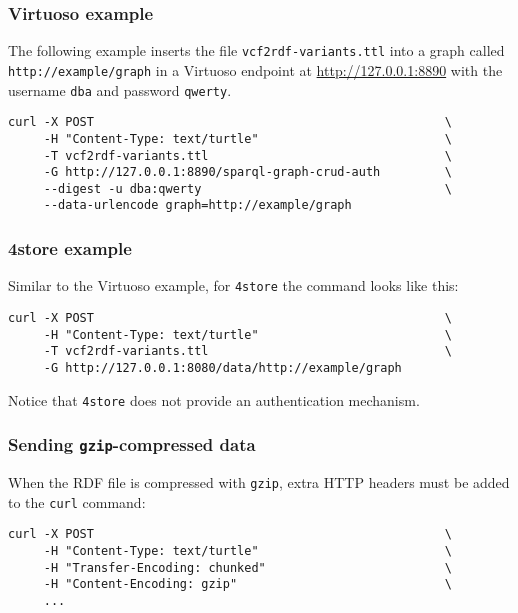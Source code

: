 \subsubsection{Virtuoso example}

\begin{sloppypar}
The following example inserts the file \texttt{vcf2rdf-variants.ttl} into
a graph called \texttt{http://example/graph} in a Virtuoso endpoint at
\url{http://127.0.0.1:8890} with the username \texttt{dba} and
password \texttt{qwerty}.
\end{sloppypar}

\begin{siderules}
\begin{verbatim}
curl -X POST                                                 \
     -H "Content-Type: text/turtle"                          \
     -T vcf2rdf-variants.ttl                                 \
     -G http://127.0.0.1:8890/sparql-graph-crud-auth         \
     --digest -u dba:qwerty                                  \
     --data-urlencode graph=http://example/graph
\end{verbatim}
\end{siderules}

\subsubsection{4store example}

Similar to the Virtuoso example, for \texttt{4store} the command looks like
this:

\begin{siderules}
\begin{verbatim}
curl -X POST                                                 \
     -H "Content-Type: text/turtle"                          \
     -T vcf2rdf-variants.ttl                                 \
     -G http://127.0.0.1:8080/data/http://example/graph
\end{verbatim}
\end{siderules}

Notice that \texttt{4store} does not provide an authentication mechanism.

\subsubsection{Sending \texttt{gzip}-compressed data}

  When the RDF file is compressed with \texttt{gzip}, extra HTTP headers must
  be added to the \texttt{curl} command:
\begin{siderules}
\begin{verbatim}
curl -X POST                                                 \
     -H "Content-Type: text/turtle"                          \
     -H "Transfer-Encoding: chunked"                         \
     -H "Content-Encoding: gzip"                             \
     ...
\end{verbatim}
\end{siderules}
